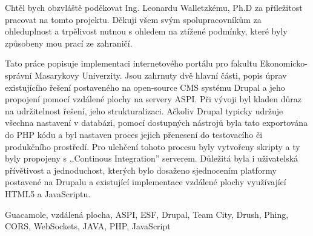 \documentclass[10pt,draft,oneside]{fithesis2}
\begin{document}
\FrontMatter
\ThesisTitlePage

\begin{ThesisDeclaration}
  \DeclarationText
  \AdvisorName
\end{ThesisDeclaration}



\begin{ThesisThanks}
Chtěl bych obzvláště poděkovat Ing. Leonardu Walletzkému, Ph.D za příležitost pracovat na tomto projektu. Děkuji všem svým spolupracovníkům za ohleduplnost a trpělivost nutnou s ohledem na ztížené podmínky, které byly způsobeny mou prací ze zahraničí.
\end{ThesisThanks}

\begin{ThesisAbstract}
Tato práce popisuje implementaci internetového portálu pro fakultu Ekonomicko-správní Masarykovy Univerzity. Jsou zahrnuty dvě hlavní části, popis úprav existujícího řešení postaveného na open-source CMS systému Drupal a jeho propojení pomocí vzdálené plochy na servery ASPI. Při vývoji byl kladen důraz na udržitelnost řešení, jeho strukturalizaci. Ačkoliv Drupal typicky udržuje všechna nastavení v databázi, pomocí dostupných nástrojů byla tato exportována do PHP kódu a byl nastaven proces jejich přenesení do testovacího či produkčního prostředí. Pro ulehčení tohoto procesu byly vytvořeny skripty a ty byly propojeny s ,,Continous Integration'' serverem. Důležitá byla i uživatelská přívětivost a jednoduchost, kterých bylo dosaženo sjednocením platformy postavené na Drupalu a existující implementace vzdálené plochy využívající HTML5 a JavaScriptu.
\end{ThesisAbstract}

\begin{ThesisKeyWords}
Guacamole, vzdálená plocha, ASPI, ESF, Drupal, Team City, Drush, Phing, CORS, WebSockets, JAVA, PHP, JavaScript
\end{ThesisKeyWords}
\end{document}
